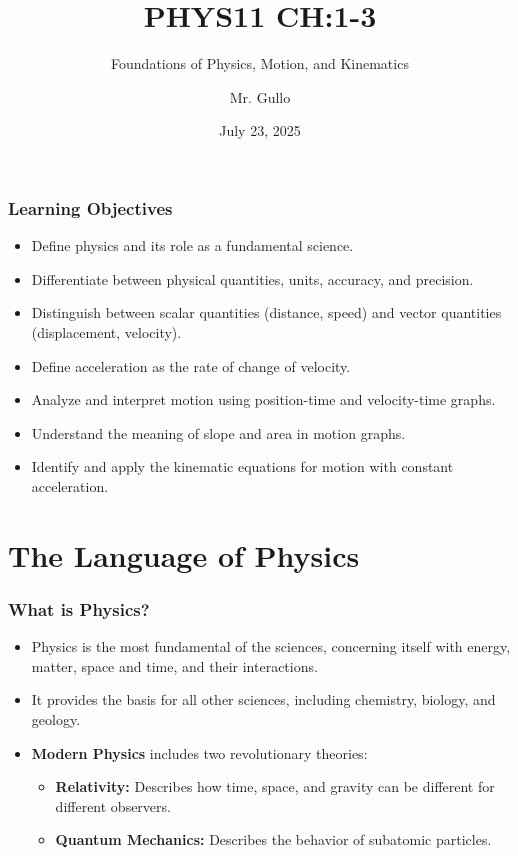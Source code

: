 \documentclass{beamer}
\title[Intro to Physics and Kinematics]{PHYS11 CH:1-3}
\subtitle{Foundations of Physics, Motion, and Kinematics}
\author[Mr. Gullo]{Mr. Gullo}
\date[Jul 2025]{July 23, 2025}
\begin{document}
\frame{\titlepage}

\begin{frame}
\frametitle{Learning Objectives}
\begin{itemize}
    \item Define physics and its role as a fundamental science.
    \pause
    \item Differentiate between physical quantities, units, accuracy, and precision.
    \pause
    \item Distinguish between scalar quantities (distance, speed) and vector quantities (displacement, velocity).
    \pause
    \item Define acceleration as the rate of change of velocity.
    \pause
    \item Analyze and interpret motion using position-time and velocity-time graphs.
    \pause
    \item Understand the meaning of slope and area in motion graphs.
    \pause
    \item Identify and apply the kinematic equations for motion with constant acceleration.
\end{itemize}
\end{frame}

\section{The Language of Physics}

\begin{frame}
\frametitle{What is Physics?}
\begin{itemize}
    \item Physics is the most fundamental of the sciences, concerning itself with \alert{energy, matter, space and time}, and their interactions.
    \pause
    \item It provides the basis for all other sciences, including chemistry, biology, and geology.
    \pause
    \item \textbf{Modern Physics} includes two revolutionary theories:
    \pause
    \begin{itemize}
        \item \textbf{Relativity:} Describes how time, space, and gravity can be different for different observers.
        \pause
        \item \textbf{Quantum Mechanics:} Describes the behavior of subatomic particles.
    \end{itemize}
\end{itemize}
\end{frame}
\end{document}
